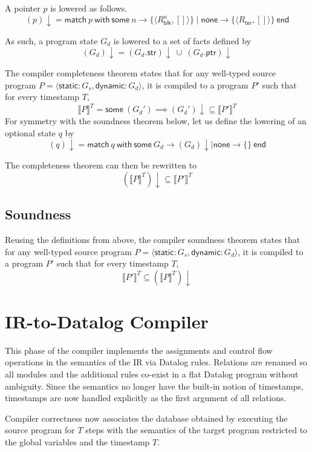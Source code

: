 \documentclass[11pt]{article}
\newcommand{\none}{\textsf{none}}
\newcommand{\some}[1]{\textsf{some}~#1}
\newcommand{\matchwith}[2]{\textsf{match}~#1~\textsf{with}~#2~\textsf{end}}
\newcommand{\blk}{\textsf{blk}}
\newcommand{\ter}{\textsf{ter}}
\newcommand{\static}{\textsf{static}}
\newcommand{\dynamic}{\textsf{dynamic}}
\newcommand{\str}{\textsf{str}}
\newcommand{\ptr}{\textsf{ptr}}
\begin{document}
A pointer $p$ is lowered as follows.
\[
(p)\downarrow =
\matchwith{p}{
  \some{n} \rightarrow \{ \langle R_{\blk{}}^n, [] \rangle \}
  \mid \none{} \rightarrow \{ \langle R_{\ter{}}, [] \rangle \}}
\]

As such, a program state $G_d$ is lowered to a set of facts defined by
\[
(G_d)\downarrow =
(G_d.\str{})\downarrow~\cup~(G_d.\ptr{})\downarrow
\]

The compiler completeness theorem states that for any well-typed source program $P = \langle \static{}: G_s, \dynamic{}: G_d \rangle$, it is compiled to a program $P'$ such that for every timestamp $T$,
\[
\llbracket P \rrbracket^T = \some(G_d') \implies (G_d')\downarrow \subseteq \llbracket P' \rrbracket^T
\]
For symmetry with the soundness theorem below, let us define the lowering of an optional state $q$ by
\[
(q)\downarrow = \matchwith{q}{\some{G_d} \rightarrow (G_d)\downarrow \mid \none{} \rightarrow \{\}}
\]

The completeness theorem can then be rewritten to
\[
(\llbracket P \rrbracket^T)\downarrow
\subseteq \llbracket P' \rrbracket^T
\]

\subsection{Soundness}
Reusing the definitions from above, the compiler soundness theorem states that for any well-typed source program $P = \langle \static{}: G_s, \dynamic{}: G_d \rangle$, it is compiled to a program $P'$ such that for every timestamp $T$,
\[
\llbracket P' \rrbracket^T \subseteq
(\llbracket P \rrbracket^T)\downarrow
\]

\section{IR-to-Datalog Compiler}
This phase of the compiler implements the assignments and control flow operations in the semantics of the IR via Datalog rules.
Relations are renamed so all modules and the additional rules co-exist in a flat Datalog program without ambiguity.
Since the semantics no longer have the built-in notion of timestamps, timestamps are now handled explicitly as the first argument of all relations.

Compiler correctness now associates the database obtained by executing the source program for $T$ steps with the semantics of the target program restricted to the global variables and the timestamp $T$.
\end{document}
